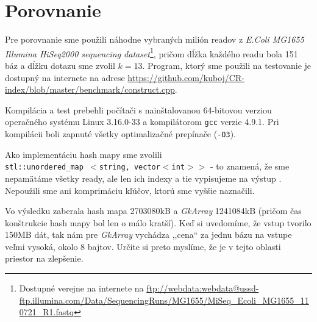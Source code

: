 \section{Porovnanie}
Pre porovnanie sme použili náhodne vybraných milión readov z \emph{E.Coli MG1655 Illumina HiSeq2000 sequencing dataset}\footnote{Dostupné verejne na internete na \url{ftp://webdata:webdata@ussd-ftp.illumina.com/Data/SequencingRuns/MG1655/MiSeq\_Ecoli\_MG1655\_110721\_R1.fastq}}, pričom dĺžka každého readu bola 151 báz a dĺžku dotazu sme zvolil $k=13$. Program, ktorý sme použili na testovanie je dostupný na internete na adrese \url{https://github.com/kuboj/CR-index/blob/master/benchmark/construct.cpp}.

Kompilácia a test prebehli počítači s nainštalovanou 64-bitovou verziou operačného systému Linux 3.16.0-33 a kompilátorom \texttt{gcc} verzie 4.9.1. Pri kompilácii boli zapnuté všetky optimalizačné prepínače (\texttt{-O3}).

Ako implementáciu hash mapy sme zvolili \\ \texttt{stl::unordered\_map $<$string, vector$<$int$>>$} - to znamená, že sme nepamätáme všetky ready, ale len ich indexy a tie vypisujeme na výstup . Nepoužili sme ani komprimáciu kľúčov, ktorú sme vyššie naznačili.

Vo výsledku zaberala hash mapa 2703080kB a \emph{GkArray} 1241084kB (pričom čas konštrukcie hash mapy bol len o málo kratší). Keď si uvedomíme, že vstup tvorilo 150MB dát, tak nám pre \emph{GkArray} vychádza ,,cena`` za jednu bázu na vstupe veľmi vysoká, okolo 8 bajtov. Určite si preto myslíme, že je v tejto oblasti priestor na zlepšenie.
